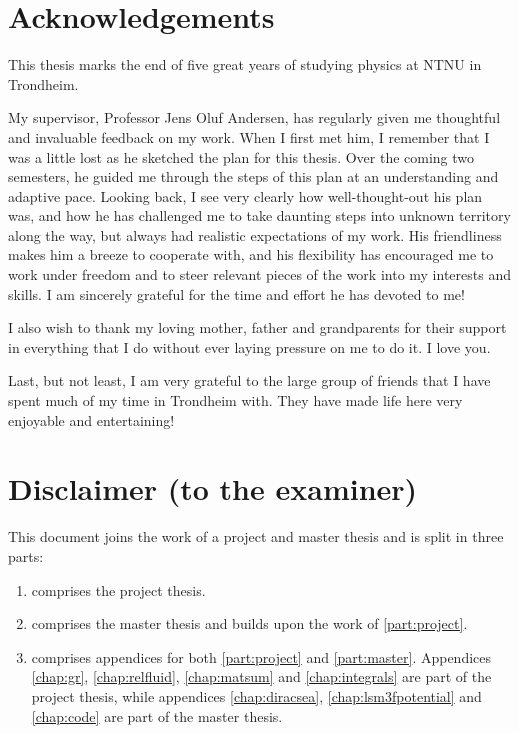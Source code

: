 \chapter*{Acknowledgements}

This thesis marks the end of five great years of studying physics at NTNU in Trondheim.

My supervisor, Professor Jens Oluf Andersen,
has regularly given me thoughtful and invaluable feedback on my work.
When I first met him,
I remember that I was a little lost as he sketched the plan for this thesis.
Over the coming two semesters, he guided me through the steps of this plan at an understanding and adaptive pace.
Looking back, I see very clearly how well-thought-out his plan was,
and how he has challenged me to take daunting steps into unknown territory along the way,
but always had realistic expectations of my work.
His friendliness makes him a breeze to cooperate with,
and his flexibility has encouraged me to work under freedom and to steer relevant pieces of the work into my interests and skills.
I am sincerely grateful for the time and effort he has devoted to me!

I also wish to thank my loving mother, father and grandparents
for their support in everything that I do
without ever laying pressure on me to do it.
I love you.

Last, but not least, I am very grateful to the large group of friends that I have spent much of my time in Trondheim with.
They have made life here very enjoyable and entertaining!


{\let\clearpage\relax\chapter*{Disclaimer (to the examiner)}}

This document joins the work of a project and master thesis and is split in three parts:
\begin{enumerate}
\item {} comprises the project thesis.
\item {} comprises the master thesis and builds upon the work of \cref{part:project}.
\item {} comprises appendices for both \cref{part:project} and \cref{part:master}.
      Appendices \ref{chap:gr}, \ref{chap:relfluid}, \ref{chap:matsum} and \ref{chap:integrals} are part of the project thesis,
      while appendices \ref{chap:diracsea}, \ref{chap:lsm3fpotential} and \ref{chap:code} are part of the master thesis.
\end{enumerate}

